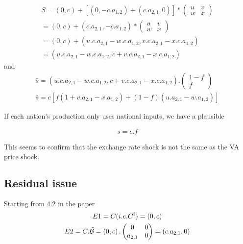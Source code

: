 \documentclass[11pt,a4paper]{article}
\begin{document}
\begin{gather*}
S =\left(0,c\right)+\left[\left(0,-c.a_{1,2}\right)+\left(c.a_{2,1},0\right)\right]*\left(\begin{matrix}u&v\\w&x\end{matrix}\right)
\\
=\left(0,c\right)+\left(c.a_{2,1},-c.a_{1,2}\right)*\left(\begin{matrix}u&v\\w&x\end{matrix}\right)
\\
=\left(0,c\right)+\left(u.c.a_{2,1}-w.c.a_{1,2},v.c.a_{2,1}-x.c.a_{1,2}\right)
\\
=\left(u.c.a_{2,1}-w.c.a_{1,2},c+v.c.a_{2,1}-x.c.a_{1,2}\right)
\end{gather*}
and
\begin{gather*}
\bar{s}=\left(u.c.a_{2,1}-w.c.a_{1,2},c+v.c.a_{2,1}-x.c.a_{1,2}\right).\left(\begin{matrix}1-f\\f\end{matrix}\right)
\\
\bar{s}=c\left[f\left(1+v.a_{2,1}-x.a_{1,2}\right)+\left(1-f\right)\left(u.a_{2,1}-w.a_{1,2}\right)\right]
\end{gather*}


If each nation's production only uses national inputs, we have a plausible

\begin{gather*}
\bar{s}=c.f
\end{gather*}

This seems to confirm that the exchange rate shock is not the same as the VA price shock.

\subsection{Residual issue}

Starting from 4.2 in the paper
\begin{gather*}
E1=C (i.e. C^i)=\left(0,c\right)
\\
E2=C.\tilde{\cal B}=\left(0,c\right).\left(\begin{matrix}0&0\\a_{2,1}&0\end{matrix}\right)=\left(c.a_{2,1},0\right)
\end{gather*}
\end{document}
